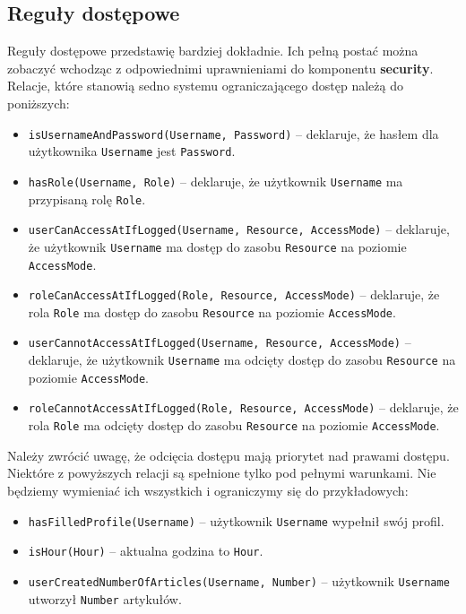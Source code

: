 \documentclass{classrep}
\begin{document}
\subsection{Reguły dostępowe}
Reguły dostępowe przedstawię bardziej dokładnie. Ich pełną postać można zobaczyć wchodząc z odpowiednimi uprawnieniami do komponentu \textbf{security}.
Relacje, które stanowią sedno systemu ograniczającego dostęp należą do poniższych:
\begin{itemize}
\item \texttt{isUsernameAndPassword(Username, Password)} -- deklaruje, że hasłem dla użytkownika \texttt{Username} jest \texttt{Password}.
\item \texttt{hasRole(Username, Role)} -- deklaruje, że użytkownik \texttt{Username} ma przypisaną rolę \texttt{Role}.
\item \texttt{userCanAccessAtIfLogged(Username, Resource, AccessMode)} -- deklaruje, że użytkownik \texttt{Username} ma dostęp do zasobu \texttt{Resource} na poziomie \texttt{AccessMode}.
\item \texttt{roleCanAccessAtIfLogged(Role, Resource, AccessMode)} -- deklaruje, że rola \texttt{Role} ma dostęp do zasobu \texttt{Resource} na poziomie \texttt{AccessMode}.
\item \texttt{userCannotAccessAtIfLogged(Username, Resource, AccessMode)} --  deklaruje, że użytkownik \texttt{Username} ma odcięty dostęp do zasobu \texttt{Resource}
na poziomie \texttt{AccessMode}.
\item \texttt{roleCannotAccessAtIfLogged(Role, Resource, AccessMode)} -- deklaruje, że rola \texttt{Role} ma odcięty dostęp do zasobu \texttt{Resource}
na poziomie \texttt{AccessMode}.
\end{itemize}
Należy zwrócić uwagę, że odcięcia dostępu mają priorytet nad prawami dostępu.
Niektóre z powyższych relacji są spełnione tylko pod pełnymi warunkami. Nie będziemy wymieniać ich wszystkich i ograniczymy się do przykładowych:
\begin{itemize}
\item \texttt{hasFilledProfile(Username)} -- użytkownik \texttt{Username} wypełnił swój profil.
\item \texttt{isHour(Hour)} -- aktualna godzina to \texttt{Hour}.
\item \texttt{userCreatedNumberOfArticles(Username, Number)} -- użytkownik \texttt{User\-name} utworzył \texttt{Number} artykułów.
\end{itemize}
\end{document}
